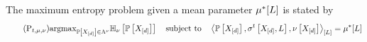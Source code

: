 The maximum entropy problem given a mean parameter $\mu^*[L]$ is stated by
\begin{equation}
    \tag{$\mathrm{P}_{\sstat,\meanparam,\basemeasure}$}\label{prob:maxEntropy}
    \argmax_{\probwith\in\distmeasuredby{\basemeasure}} \sentropyofwrt{\probwith}{\basemeasure}
    \stspace
    \contractionof{\probwith,\sencsstatwith,\basemeasurewith}{\selvariable} = \genmeanat{\selvariable}
\end{equation}